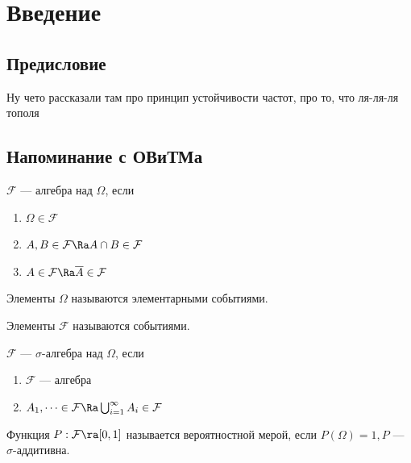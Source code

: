 

\section{Введение}
\subsection{Предисловие}
Ну чето рассказали там про принцип устойчивости частот, про то, что ля-ля-ля тополя

\subsection{Напоминание с ОВиТМа}

\begin{definition}
    \(\mathcal{F}\) --- алгебра над \(\Omega\), если 
    \begin{enumerate}
        \item \(\Omega \in \mathcal{F}\)
        \item \(A, B \in \mathcal{F} \Ra A \cap B \in \mathcal{F}\)
        \item \(A \in \mathcal{F} \Ra \overline{A} \in \mathcal{F}\)
    \end{enumerate}
\end{definition}

\begin{note}
    Элементы \(\Omega\) называются элементарными событиями.
\end{note}

\begin{note}
    Элементы \(\mathcal{F}\) называются событиями.
\end{note}

\begin{definition}
    \(\mathcal{F}\) --- \(\sigma\)-алгебра над \(\Omega\), если 
    \begin{enumerate}
        \item \(\mathcal{F}\) --- алгебра
        \item \(A_1, \dots \in \mathcal{F} \Ra \bigcup_{i = 1}^\infty A_i \in \mathcal{F}\)
    \end{enumerate}
\end{definition}

\begin{definition}
    Функция \(P: \mathcal{F} \ra [0, 1]\) называется вероятностной мерой, если \(P(\Omega) = 1, P\) --- \(\sigma\)-аддитивна.
\end{definition}

